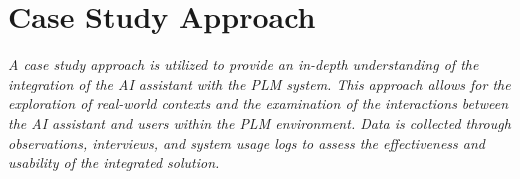 \section{Case Study Approach}
\label{sec:case-study-approach}


\textit{A case study approach is utilized to provide an in-depth understanding of the integration of the AI assistant with the PLM system. This approach allows for the exploration of real-world contexts and the examination of the interactions between the AI assistant and users within the PLM environment. Data is collected through observations, interviews, and system usage logs to assess the effectiveness and usability of the integrated solution.}
